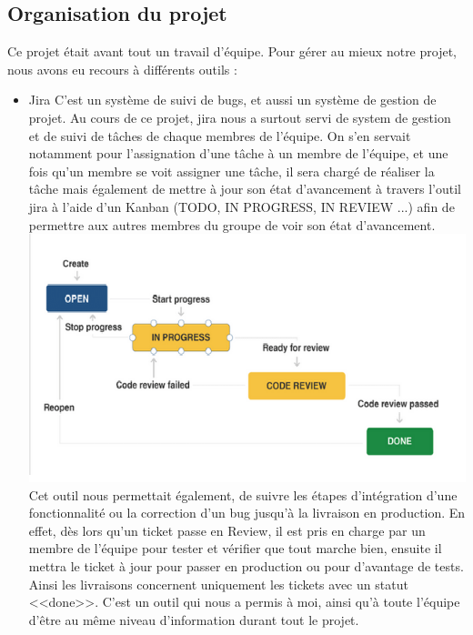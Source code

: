 \documentclass[12pt,a4paper]{report}
\begin{document}
\subsection{Organisation du projet}
Ce projet était avant tout un travail d'équipe. Pour gérer au mieux notre projet, nous avons eu recours à différents outils :
\begin{itemize}
\item Jira \vspace{0.3cm} \newline 
C'est un système de suivi de bugs, et aussi un système de gestion de projet. Au cours de ce projet, jira nous a surtout servi de system de gestion et de suivi de tâches de chaque membres de l'équipe. On s'en servait notamment pour l'assignation d'une tâche à un membre de l'équipe, et une fois qu'un membre se voit assigner une tâche, il sera chargé de réaliser la tâche mais également de mettre à jour son état d'avancement à travers l'outil jira à l'aide d'un Kanban (TODO, IN PROGRESS, IN REVIEW ...) afin de permettre aux autres membres du groupe de voir son état d'avancement.
\newline  \includegraphics[scale=1]{IMG/ejira.png} \vspace{0.2cm}\newline
Cet outil nous permettait également, de suivre les étapes d'intégration d'une fonctionnalité ou la correction d'un bug jusqu'à la livraison en production. En effet, dès lors qu'un ticket passe en Review, il est pris en charge par un membre de l'équipe pour tester et vérifier que tout marche bien, ensuite il mettra le ticket à jour pour passer en production ou pour d'avantage de tests. Ainsi les livraisons concernent uniquement les tickets avec un statut <<done>>. C'est un outil qui nous a permis à moi, ainsi qu'à toute l'équipe d'être au même niveau d'information durant tout le projet.\vspace{0.1cm}\newline 

\end{itemize}
\end{document}
